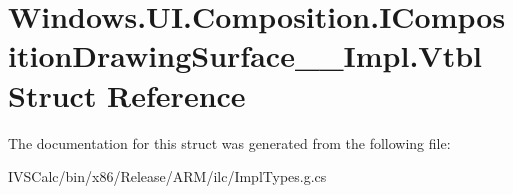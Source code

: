 \hypertarget{struct_windows_1_1_u_i_1_1_composition_1_1_i_composition_drawing_surface_____impl_1_1_vtbl}{}\section{Windows.\+U\+I.\+Composition.\+I\+Composition\+Drawing\+Surface\+\_\+\+\_\+\+Impl.\+Vtbl Struct Reference}
\label{struct_windows_1_1_u_i_1_1_composition_1_1_i_composition_drawing_surface_____impl_1_1_vtbl}


The documentation for this struct was generated from the following file\+:\begin{DoxyCompactItemize}
\item 
I\+V\+S\+Calc/bin/x86/\+Release/\+A\+R\+M/ilc/Impl\+Types.\+g.\+cs\end{DoxyCompactItemize}
